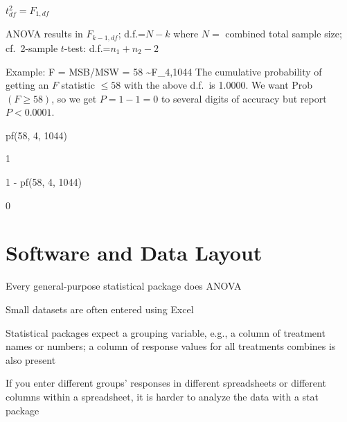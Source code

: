   \ei
 \ei
\item $t_{df}^{2} = F_{1,df}$
\item ANOVA results in $F_{k-1,df}$; d.f.=$N-k$ where $N=$ combined
  total sample size; cf.\ 2-sample $t$-test: d.f.=$n_{1}+n_{2}-2$
\item Example: 
\beq
F = MSB/MSW = 58 \sim F_{4,1044}
\eeq
The cumulative probability of getting an $F$ statistic $\leq 58$ with
the above d.f.\ is 1.0000.  We want Prob$(F\geq 58)$, so we get
$P=1-1=0$ to several digits of accuracy but report $P<0.0001$.
\ei
\begin{Schunk}
\begin{Sinput}
pf(58, 4, 1044)
\end{Sinput}
\begin{Soutput}
[1] 1
\end{Soutput}
\begin{Sinput}
1 - pf(58, 4, 1044)
\end{Sinput}
\begin{Soutput}
[1] 0
\end{Soutput}
\end{Schunk}

\section{Software and Data Layout}
\bi
\item Every general-purpose statistical package does ANOVA
\item Small datasets are often entered using Excel
\item Statistical packages expect a grouping variable, e.g., a column
  of treatment names or numbers; a column of response values for all
  treatments combines is also present
\item If you enter different groups' responses in different spreadsheets or
  different columns within a spreadsheet, it is harder to analyze the
  data with a stat package
\ei

